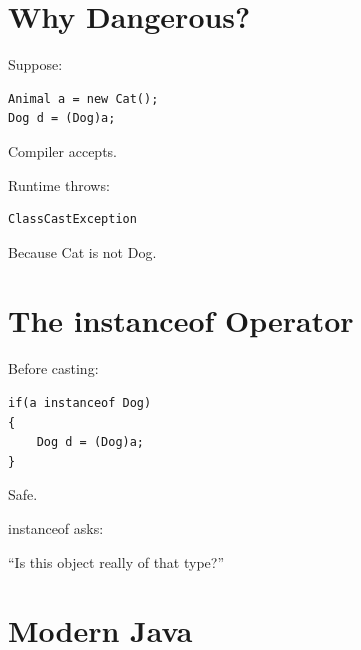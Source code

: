 \documentclass[11pt,a4paper]{book}
\begin{document}

\section{Why Dangerous?}

Suppose:

\begin{verbatim}
Animal a = new Cat();
Dog d = (Dog)a;
\end{verbatim}


Compiler accepts.


Runtime throws:

\begin{verbatim}
ClassCastException
\end{verbatim}


Because Cat is not Dog.


\section{The instanceof Operator}

Before casting:

\begin{verbatim}
if(a instanceof Dog)
{
    Dog d = (Dog)a;
}
\end{verbatim}


Safe.


\begin{idea}

instanceof asks:

``Is this object really of that type?''

\end{idea}


\section{Modern Java}
\end{document}
